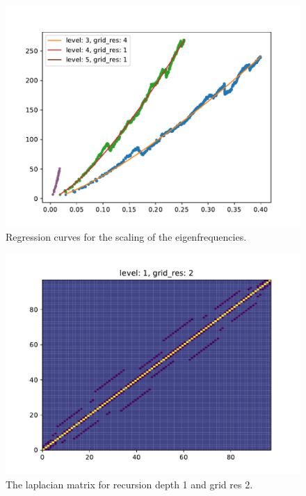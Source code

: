 \documentclass{article}
\begin{document}
\begin{figure}
    \includegraphics[width=\linewidth]{./media/idos.pdf}
    \caption{Regression curves for the scaling of the eigenfrequencies.}
    \label{fig:idos}
\end{figure}

\begin{figure}
    \includegraphics[width=\linewidth]{./media/laplacian_matrix.pdf}
    \caption{The laplacian matrix for recursion depth 1 and grid res 2.}
    \label{fig:laplacian-matrix}
\end{figure}
\end{document}

